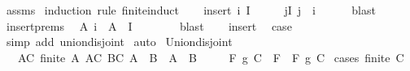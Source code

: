 \begin{isabellebody}
\ assms\isanewline
{}\isamarkupfalse%
\ {\isacharparenleft}{\kern0pt}induction\ rule{\isacharcolon}{\kern0pt}\ finite{\isacharunderscore}{\kern0pt}induct{\isacharparenright}{\kern0pt}\isanewline
\ \ \isamarkupfalse%
\ {\isacharparenleft}{\kern0pt}insert\ i\ I{\isacharparenright}{\kern0pt}\isanewline
\ \ \isamarkupfalse%
\ \isamarkupfalse%
\ {\isachardoublequoteopen}{\isasymforall}j{\isasymin}I{\isachardot}{\kern0pt}\ j\ {\isasymnoteq}\ i{\isachardoublequoteclose}\isanewline
\ \ \ \ \isamarkupfalse%
\ blast\isanewline
\ \ \isamarkupfalse%
\ insert{\isachardot}{\kern0pt}prems\ \isamarkupfalse%
\ {\isachardoublequoteopen}A\ i\ {\isasyminter}\ {\isasymUnion}{\isacharparenleft}{\kern0pt}A\ {\isacharbackquote}{\kern0pt}\ I{\isacharparenright}{\kern0pt}\ {\isacharequal}{\kern0pt}\ {\isacharbraceleft}{\kern0pt}{\isacharbraceright}{\kern0pt}{\isachardoublequoteclose}\isanewline
\ \ \ \ \isamarkupfalse%
\ blast\isanewline
\ \ \isamarkupfalse%
\ insert\ \isamarkupfalse%
\ {\isacharquery}{\kern0pt}case\isanewline
\ \ \ \ \isamarkupfalse%
\ {\isacharparenleft}{\kern0pt}simp\ add{\isacharcolon}{\kern0pt}\ union{\isacharunderscore}{\kern0pt}disjoint{\isacharparenright}{\kern0pt}\isanewline
{}\isamarkupfalse%
\ auto%
\endisatagproof
{\isafoldproof}%
%
\isadelimproof
\isanewline
%
\endisadelimproof
\isanewline
{}\isamarkupfalse%
\ Union{\isacharunderscore}{\kern0pt}disjoint{\isacharcolon}{\kern0pt}\isanewline
\ \ \ {\isachardoublequoteopen}{\isasymforall}A{\isasymin}C{\isachardot}{\kern0pt}\ finite\ A{\isachardoublequoteclose}\ {\isachardoublequoteopen}{\isasymforall}A{\isasymin}C{\isachardot}{\kern0pt}\ {\isasymforall}B{\isasymin}C{\isachardot}{\kern0pt}\ A\ {\isasymnoteq}\ B\ {\isasymlongrightarrow}\ A\ {\isasyminter}\ B\ {\isacharequal}{\kern0pt}\ {\isacharbraceleft}{\kern0pt}{\isacharbraceright}{\kern0pt}{\isachardoublequoteclose}\isanewline
\ \ \ {\isachardoublequoteopen}F\ g\ {\isacharparenleft}{\kern0pt}{\isasymUnion}C{\isacharparenright}{\kern0pt}\ {\isacharequal}{\kern0pt}\ {\isacharparenleft}{\kern0pt}F\ {\isasymcirc}\ F{\isacharparenright}{\kern0pt}\ g\ C{\isachardoublequoteclose}\isanewline
%
\isadelimproof
%
\endisadelimproof
%
\isatagproof
{}\isamarkupfalse%
\ {\isacharparenleft}{\kern0pt}cases\ {\isachardoublequoteopen}finite\ C{\isachardoublequoteclose}{\isacharparenright}{\kern0pt}\isanewline
\ \ \isamarkupfalse%

\end{isabellebody}
